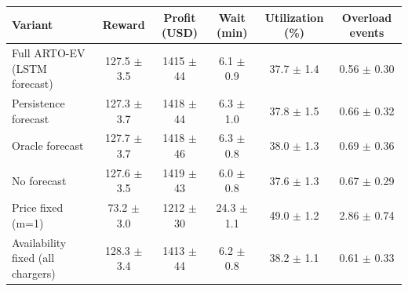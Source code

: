 \begin{tabular}{@{}lccccc@{}}
\toprule
Variant & Reward & Profit (USD) & Wait (min) & Utilization (\%) & Overload events \\
\midrule
Full ARTO-EV (LSTM forecast) & 127.5 $\pm$ 3.5 & 1415 $\pm$ 44 & 6.1 $\pm$ 0.9 & 37.7 $\pm$ 1.4 & 0.56 $\pm$ 0.30 \\
Persistence forecast & 127.3 $\pm$ 3.7 & 1418 $\pm$ 44 & 6.3 $\pm$ 1.0 & 37.8 $\pm$ 1.5 & 0.66 $\pm$ 0.32 \\
Oracle forecast & 127.7 $\pm$ 3.7 & 1418 $\pm$ 46 & 6.3 $\pm$ 0.8 & 38.0 $\pm$ 1.3 & 0.69 $\pm$ 0.36 \\
No forecast & 127.6 $\pm$ 3.5 & 1419 $\pm$ 43 & 6.0 $\pm$ 0.8 & 37.6 $\pm$ 1.3 & 0.67 $\pm$ 0.29 \\
Price fixed (m=1) & 73.2 $\pm$ 3.0 & 1212 $\pm$ 30 & 24.3 $\pm$ 1.1 & 49.0 $\pm$ 1.2 & 2.86 $\pm$ 0.74 \\
Availability fixed (all chargers) & 128.3 $\pm$ 3.4 & 1413 $\pm$ 44 & 6.2 $\pm$ 0.8 & 38.2 $\pm$ 1.1 & 0.61 $\pm$ 0.33 \\
\bottomrule
\end{tabular}